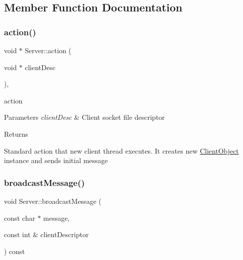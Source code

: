 \subsection{Member Function Documentation}
\mbox{\label{classServer_a75b8fdcfd5e0438efe7bb79b317caa16}} 
\subsubsection{\texorpdfstring{action()}{action()}}
{\footnotesize\ttfamily void $\ast$ Server\+::action (\begin{DoxyParamCaption}\item[{void $\ast$}]{client\+Desc }\end{DoxyParamCaption})\hspace{0.3cm}{\ttfamily [static]}, {\ttfamily [private]}}



action 


\begin{DoxyParams}{Parameters}
{\em client\+Desc} & Client socket file descriptor \\
\hline
\end{DoxyParams}
\begin{DoxyReturn}{Returns}

\end{DoxyReturn}
Standard action that new client thread executes. It creates new \hyperlink{classClientObject}{Client\+Object} instance and sends initial message \mbox{\label{classServer_a7153ea97c1112ae9dc61c65dc59c7f82}} 
\subsubsection{\texorpdfstring{broadcast\+Message()}{broadcastMessage()}}
{\footnotesize\ttfamily void Server\+::broadcast\+Message (\begin{DoxyParamCaption}\item[{const char $\ast$}]{message,  }\item[{const int \&}]{client\+Descriptor }\end{DoxyParamCaption}) const\hspace{0.3cm}{\ttfamily [private]}}



